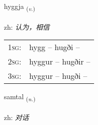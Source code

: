 \documentclass[frontgrid, backgrid]{flacards}\usepackage[]{graphicx}\usepackage[]{color}
\begin{document}
\renewcommand{\blhead}{\vskip5pt {\small\bfseries\footnotesize Sagnorð | 动词 }}
\renewcommand{\bcfoot}{\vskip5pt \hspace{2pt}{\small\bfseries\footnotesize 2K}}


{hyggja \small{\textsubscript{(\textit{v.})}} \\[1ex] %
\textphonetic{[hɪca]} \\
zh: \emph{认为，相信} \\  [2ex]
\renewcommand*{\arraystretch}{0.8}
\begin{tabular}{p{1cm}l}
\textsc{1sg}: & hygg -- hugði --  \\ 
\textsc{2sg}: & hyggur -- hugðir --  \\ 
\textsc{3sg}: & hyggur -- hugði --  \\ 
\end{tabular}
}

\renewcommand{\flhead}{\vskip5pt \fboxsep=0pt {\small\bfseries\footnotesize Nafnorð | 名词}}
\renewcommand{\fcfoot}{\vskip5pt \fboxsep=0pt \hspace{2pt}{\small\bfseries\footnotesize 2K}}

\renewcommand{\blhead}{\vskip5pt {\small\bfseries\footnotesize Nafnorð | 名词 }}
\renewcommand{\bcfoot}{\vskip5pt \hspace{2pt}{\small\bfseries\footnotesize 2K}}


{samtal \small{\textsubscript{(\textit{n.})}} \\[1ex] %
\textphonetic{[samtʰal]} \\
zh: \emph{对话} \\  [2ex]
\renewcommand*{\arraystretch}{0.8}
}

\renewcommand{\flhead}{\vskip5pt \fboxsep=0pt {\small\bfseries\footnotesize Nafnorð | 名词}}
\renewcommand{\fcfoot}{\vskip5pt \fboxsep=0pt \hspace{2pt}{\small\bfseries\footnotesize 2K}}
\end{document}
